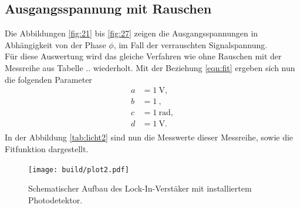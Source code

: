 \subsection{Ausgangsspannung mit Rauschen}
Die Abbildungen \ref{fig:21} bis \ref{fig:27} zeigen die Ausgangsspannungen in Abhängigkeit von der Phase $\phi$, im Fall der verrauschten Signalspannung.
\\
\newline 
Für diese Auswertung wird das gleiche Verfahren wie ohne Rauschen mit der Messreihe aus Tabelle .. wiederholt. Mit der Beziehung \eqref{eqn:fit} ergeben sich nun die folgenden
Parameter
\begin{align}
    a &= \SI{1}{\volt},\\
    b &= \SI{1}{},\\
    c &= \SI{1}{\radian},\\
    d &= \SI{1}{\volt}.\\
\end{align}
In der Abbildung \ref{tab:licht2} sind nun die Messwerte dieser Messreihe, sowie die Fitfunktion dargestellt.
\begin{figure}
    \centering
    \texttt{[image: build/plot2.pdf]}
    \caption{Schematischer Aufbau des Lock-In-Verstäker mit installiertem Photodetektor. \cite{skript}} 
    \label{fig:licht2}
\end{figure}
